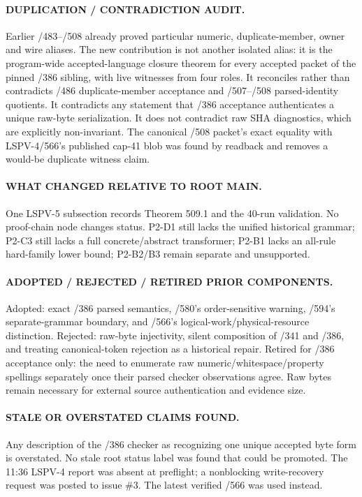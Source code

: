 \documentclass[11pt]{article}
\begin{document}
\paragraph{DUPLICATION / CONTRADICTION AUDIT.}
Earlier /483--/508 already proved particular numeric, duplicate-member, owner
and wire aliases.  The new contribution is not another isolated alias: it is
the program-wide accepted-language closure theorem for every accepted packet
of the pinned /386 sibling, with live witnesses from four roles.  It reconciles
rather than contradicts /486 duplicate-member acceptance and /507--/508
parsed-identity quotients.  It contradicts any statement that /386 acceptance
authenticates a unique raw-byte serialization.  It does not contradict raw
SHA diagnostics, which are explicitly non-invariant.
The canonical /508 packet's exact equality with LSPV-4/566's published
cap-41 blob was found by readback and removes a would-be duplicate witness
claim.

\paragraph{WHAT CHANGED RELATIVE TO ROOT MAIN.}
One LSPV-5 subsection records Theorem 509.1 and the 40-run validation.  No
proof-chain node changes status.  P2-D1 still lacks the unified historical
grammar; P2-C3 still lacks a full concrete/abstract transformer; P2-B1 lacks
an all-rule hard-family lower bound; P2-B2/B3 remain separate and unsupported.

\paragraph{ADOPTED / REJECTED / RETIRED PRIOR COMPONENTS.}
Adopted: exact /386 parsed semantics, /580's order-sensitive warning, /594's
separate-grammar boundary, and /566's logical-work/physical-resource
distinction.  Rejected: raw-byte injectivity, silent composition of /341 and
/386, and treating canonical-token rejection as a historical repair.  Retired
for /386 acceptance only: the need to enumerate raw numeric/whitespace/property
spellings separately once their parsed checker observations agree.  Raw bytes
remain necessary for external source authentication and evidence size.

\paragraph{STALE OR OVERSTATED CLAIMS FOUND.}
Any description of the /386 checker as recognizing one unique accepted byte
form is overstated.  No stale root status label was found that could be
promoted.  The 11:36 LSPV-4 report was absent at preflight; a nonblocking
write-recovery request was posted to issue \#3.  The latest verified /566 was
used instead.
\end{document}
